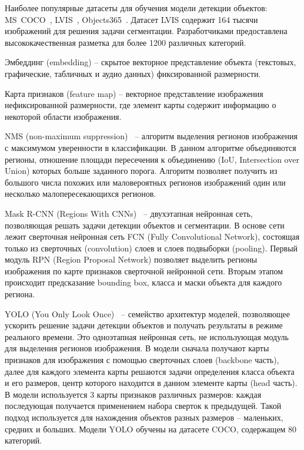 \documentclass[a4paper,14pt]{article}
\begin{document}
    Наиболее популярные датасеты для обучения модели детекции объектов: MS~COCO~\cite{COCO}, LVIS~\cite{LVIS}, Objects365~\cite{Objects365}.
    Датасет LVIS содержит 164 тысячи изображений для решения задачи сегментации. Разработчиками предоставлена высококачественная разметка для более 1200 различных категорий.
    
    Эмбеддинг (embedding) -- скрытое векторное представление объекта (текстовых, графические, табличных и аудио данных) фиксированной размерности.

    Карта признаков (feature map) -- векторное представление изображения нефиксированной размерности, где элемент карты содержит информацию о некоторой области изображения.

    NMS (non-maximum suppression)~\cite{neubeck2006efficient} -- алгоритм выделения регионов изображения с максимумом уверенности в классификации.
    В данном алгоритме объединяются регионы, отношение площади пересечения к объединению (IoU, Intersection over Union) которых больше заданного порога.
    Алгоритм позволяет получить из большого числа похожих или маловероятных регионов изображений один или несколько малопересекающихся регионов.

    Mask R-CNN (Regions With CNNs)~\cite{MaskRCNN} -- двухэтапная нейронная сеть, позволяющая решать задачи детекции объектов и сегментации. В основе сети лежит сверточная нейронная сеть FCN (Fully Convolutional Network), состоящая только из сверточных (convolution) слоев и слоев подвыборки (pooling). Первый модуль RPN (Region Proposal Network) позволяет выделить регионы изображения по карте признаков сверточной нейронной сети. Вторым этапом происходит предсказание bounding box, класса и маски объекта для каждого региона.

    YOLO (You Only Look Once)~\cite{redmon2016you} -- семейство архитектур моделей, позволяющее ускорить решение задачи детекции объектов и получать результаты в режиме реального времени.
    Это одноэтапная нейронная сеть, не использующая модуль для выделения регионов изображения.
    В модели сначала получают карты признаков для изображения с помощью сверточных слоев (backbone часть), далее для каждого элемента карты решаются задачи определения класса объекта и его размеров, центр которого находится в данном элементе карты (head часть).
    В модели используется 3 карты признаков различных размеров: каждая последующая получается применением набора сверток к предыдущей.
    Такой подход используется для нахождения объектов разных размеров -- маленьких, средних и больших.
    Модели YOLO обучены на датасете COCO, содержащем 80 категорий.
\end{document}
